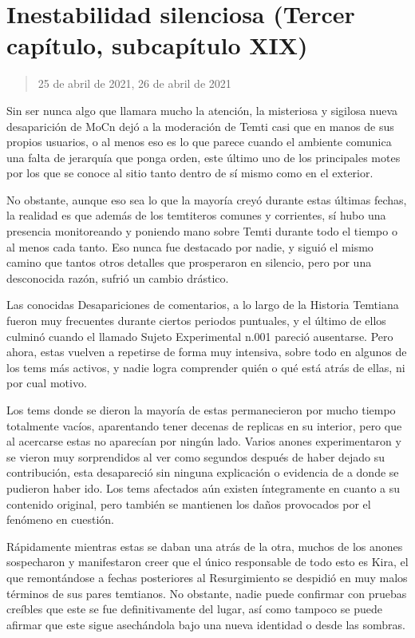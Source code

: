 \documentclass[
  spanish,
]{book}
\begin{document}
\hypertarget{inestabilidad-silenciosa-tercer-capuxedtulo-subcapuxedtulo-xix}{%
\section{Inestabilidad silenciosa (Tercer capítulo, subcapítulo XIX)}\label{inestabilidad-silenciosa-tercer-capuxedtulo-subcapuxedtulo-xix}}

\begin{quote}
25 de abril de 2021, 26 de abril de 2021
\end{quote}

Sin ser nunca algo que llamara mucho la atención, la misteriosa y sigilosa nueva desaparición de MoCn dejó a la moderación de Temti casi que en manos de sus propios usuarios, o al menos eso es lo que parece cuando el ambiente comunica una falta de jerarquía que ponga orden, este último uno de los principales motes por los que se conoce al sitio tanto dentro de sí mismo como en el exterior.

No obstante, aunque eso sea lo que la mayoría creyó durante estas últimas fechas, la realidad es que además de los temtiteros comunes y corrientes, sí hubo una presencia monitoreando y poniendo mano sobre Temti durante todo el tiempo o al menos cada tanto. Eso nunca fue destacado por nadie, y siguió el mismo camino que tantos otros detalles que prosperaron en silencio, pero por una desconocida razón, sufrió un cambio drástico.

Las conocidas Desapariciones de comentarios, a lo largo de la Historia Temtiana fueron muy frecuentes durante ciertos periodos puntuales, y el último de ellos culminó cuando el llamado Sujeto Experimental n.001 pareció ausentarse. Pero ahora, estas vuelven a repetirse de forma muy intensiva, sobre todo en algunos de los tems más activos, y nadie logra comprender quién o qué está atrás de ellas, ni por cual motivo.

Los tems donde se dieron la mayoría de estas permanecieron por mucho tiempo totalmente vacíos, aparentando tener decenas de replicas en su interior, pero que al acercarse estas no aparecían por ningún lado. Varios anones experimentaron y se vieron muy sorprendidos al ver como segundos después de haber dejado su contribución, esta desapareció sin ninguna explicación o evidencia de a donde se pudieron haber ido. Los tems afectados aún existen íntegramente en cuanto a su contenido original, pero también se mantienen los daños provocados por el fenómeno en cuestión.

Rápidamente mientras estas se daban una atrás de la otra, muchos de los anones sospecharon y manifestaron creer que el único responsable de todo esto es Kira, el que remontándose a fechas posteriores al Resurgimiento se despidió en muy malos términos de sus pares temtianos. No obstante, nadie puede confirmar con pruebas creíbles que este se fue definitivamente del lugar, así como tampoco se puede afirmar que este sigue asechándola bajo una nueva identidad o desde las sombras.
\end{document}
